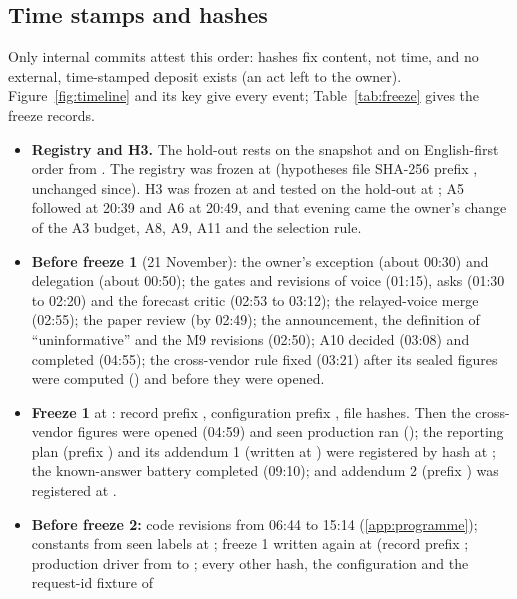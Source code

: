 \subsection{Time stamps and hashes}
\label{app:timeline}

Only internal commits attest this order: hashes fix content, not time, and no external, time-stamped deposit exists
(an act left to the owner). Figure~\ref{fig:timeline} and its key give every event; Table~\ref{tab:freeze} gives the
freeze records.

\begin{itemize}
\setlength{\itemsep}{0pt}
\item \textbf{Registry and H3.} The hold-out rests on the snapshot and on English-first order from \EnglishFirstStamp.
The registry was frozen at \RegistryFrozenStamp{} (hypotheses file SHA-256 prefix \HypothesesShaPrefix, unchanged
since). H3 was frozen at \HThreeFrozenStamp{} and tested on the hold-out at \HThreeRunStamp; A5 followed at 20:39 and
A6 at 20:49, and that evening came the owner's change of the A3 budget, A8, A9, A11 and the selection rule.
\item \textbf{Before freeze 1} (21 November): the owner's exception (about 00:30) and delegation (about 00:50); the gates
and revisions of voice (01:15), asks (01:30 to 02:20) and the forecast critic (02:53 to 03:12); the relayed-voice merge
(02:55); the paper review (by 02:49); the announcement, the definition of ``uninformative'' and the M9 revisions
(02:50); A10 decided (03:08) and completed (04:55); the cross-vendor rule fixed (03:21) after its sealed figures were
computed (\VtrSealMadeStamp) and before they were opened.
\item \textbf{Freeze 1} at \FreezeOneStamp: record prefix \FreezeOnePrefix, configuration prefix
\FreezeOneConfigPrefix, \FreezeOneFiles{} file hashes. Then the cross-vendor figures were opened (04:59) and seen
production ran (\ProdSeenStamp); the reporting plan (prefix \PlanShaPrefix) and its addendum 1 (written at
\AddendumOneStamp) were registered by hash at \PlanRegisteredStamp; the known-answer battery completed (09:10); and
addendum 2 (prefix \AddendumTwoShaPrefix) was registered at \AddendumTwoStamp.
\item \textbf{Before freeze 2:} code revisions from 06:44 to 15:14 (\ref{app:programme}); constants from seen labels at
\ConstantsStamp; freeze 1 written again at \FreezeOneAmendStamp{} (record prefix \FreezeOneAmendPrefix; production
driver from \ProduceOldPrefix{} to \ProduceNewPrefix; every other hash, the configuration and the request-id fixture of

\end{itemize}
